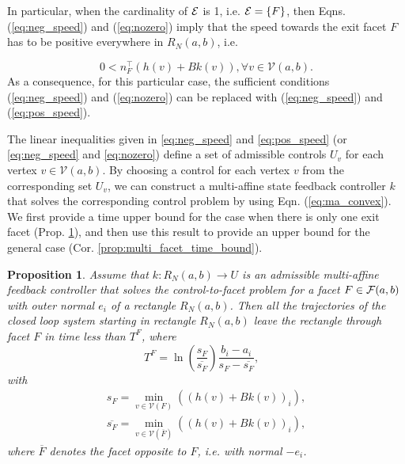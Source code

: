 \documentclass{ifacconf}
\newtheorem{proposition}{Proposition}
\newcommand{\FNab}{{\cal F}(a,b)}
\newcommand{\VNset}{\mathcal{V}(a,b)}
\newcommand{\RNab}{R_N(a,b)}
\newcommand{\Fset}{{\cal E}}
\newcommand{\minSAP}{\ensuremath{\min_{v \in \mathcal{V}(F)}  ((h(v) + Bk(v))_i) }}
\newcommand{\minSBP}{\ensuremath{  \min_{v \in \mathcal{V}( {\overline{F}})}  ((h(v) + Bk(v))_i)}}
\begin{document}
In particular, when the cardinality of $\Fset$ is 1, i.e. $\Fset = \{F\}$, 
then Eqns. (\ref{eq:neg_speed}) and (\ref{eq:nozero}) imply that the speed towards the exit facet $F$ has to be positive everywhere in $\RNab$, i.e.

\begin{equation} \label{eq:pos_speed}
	0 < n_F^\top(h(v) + Bk(v)), \forall v\in \VNset.
\end{equation}
As a consequence, for this particular case, the sufficient conditions (\ref{eq:neg_speed}) and (\ref{eq:nozero}) can be replaced with (\ref{eq:neg_speed}) and 
(\ref{eq:pos_speed}). 


The linear inequalities given in \eqref{eq:neg_speed} and \eqref{eq:pos_speed} (or  \eqref{eq:neg_speed} and  \eqref{eq:nozero}) 
define a set of admissible controls $U_v$ for each vertex $v \in \VNset$. By choosing a control for each vertex $v$ from the corresponding set $U_v$, we can construct a multi-affine state feedback controller $k$ that solves the corresponding control problem by using Eqn. (\ref{eq:ma_convex}). We first provide a time upper bound for the case when there is only one exit facet (Prop. \ref{prop:time_bound}), and then use this result to provide an upper bound for the general case (Cor. \ref{prop:multi_facet_time_bound}). 

\begin{proposition}\label{prop:time_bound}
Assume that $k: \RNab\longrightarrow U$ is an admissible multi-affine feedback controller that solves the control-to-facet problem for a facet $F \in \FNab$ with outer normal $e_i$ of a rectangle $\RNab$. Then all the trajectories of the closed loop system starting in rectangle $\RNab$ leave the rectangle through facet $F$ in time less than $T^F$, where
\begin{equation}\label{eq:TF}
		T^F = \ln( \frac{s_F}{\overline{s_F}})\frac{b_i - a_i}{  s_F   - \overline{s_F}},  \hspace{10pt}
  \end{equation}
with
\begin{align}
  	s_{F} = \minSAP \nonumber, \\
  	\overline{s_F} = \minSBP, \nonumber
  \end{align}
where $\overline {F}$ denotes the facet opposite to $F$, i.e. with normal $-e_i$.
\end{proposition}
\end{document}
